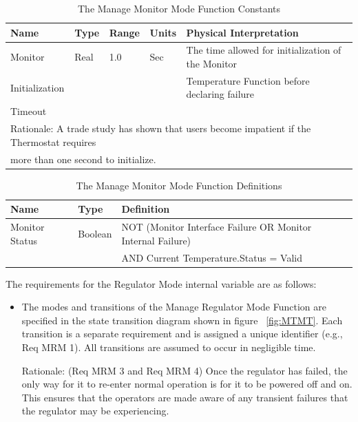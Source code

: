 \begin{table}
\begin{tabular}{|l|l|l|l|l|}
\hline
Name & Type & Range & Units & Physical Interpretation \\\hline
Monitor & Real & 1.0 & Sec & The time allowed for initialization of the Monitor \\
Initialization &  &  &  & Temperature Function before declaring failure \\
Timeout &  &  &  &  \\\hline
\multicolumn{5}{|l|}{Rationale: A trade study has shown that users become impatient if the Thermostat requires} \\
\multicolumn{5}{|l|}{more than one second to initialize.} \\\hline
\end{tabular}
\caption{The Manage Monitor Mode Function Constants}
\label{tab:MMMF-constants}
\end{table}

\begin{table}
\begin{tabular}{|l|l|l|}
\hline
Name & Type & Definition \\\hline
Monitor Status & Boolean & NOT (Monitor Interface Failure OR Monitor Internal Failure) \\
  &  & AND Current Temperature.Status = Valid \\\hline
\end{tabular}
\caption{The Manage Monitor Mode Function Definitions}
\label{tab:MMMF-definitions}
\end{table}

The requirements for the Regulator Mode internal variable are as follows:

\begin{itemize}
\item The modes and transitions of the Manage Regulator Mode Function are specified in the
      state transition diagram shown in figure ~\ref{fig:MTMT}. Each transition is a separate requirement
      and is assigned a unique identifier (e.g., Req MRM 1). All transitions are assumed to
      occur in negligible time.

      Rationale: (Req MRM 3 and Req MRM 4) Once the regulator has failed, the only way
      for it to re-enter normal operation is for it to be powered off and on. This ensures that the
      operators are made aware of any transient failures that the regulator may be experiencing.
\end{itemize}

